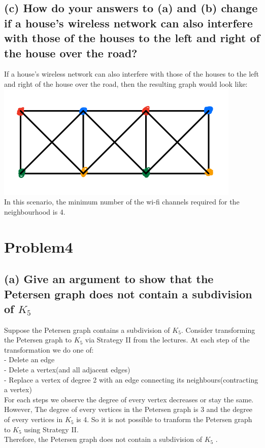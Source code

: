 \documentclass[]{article}
\begin{document}
\begin{spacing}{1.5}
		\subsection*{(c) How do your answers to (a) and (b) change if a house's wireless network can also interfere with those of the houses to the left and right of the house over the road?}
		If a house's wireless network can also interfere with those of the houses to the left and right of the house over the road, then the resulting graph would look like:\\
		\includegraphics{3}\\
		In this scenario, the minimum number of the wi-fi channels required for the neighbourhood is 4.
		
		
		\section*{Problem4}
		\subsection*{(a) Give an argument to show that the Petersen graph does not contain a subdivision of $ K_5 $}
		Suppose the Petersen graph contains a subdivision of $ K_5 $. Consider transforming the Petersen graph to $ K_5 $ via Strategy II from the lectures. At each step of the transformation we do one of:\\
		- Delete an edge\\
		- Delete a vertex(and all adjacent edges)\\
		- Replace a vertex of degree 2 with an edge connecting its neighbours(contracting a vertex)\\
		For each steps we observe the degree of every vertex decreases or stay the same. However, The degree of every vertices in the Petersen graph is 3 and the degree of every vertices in $ K_5 $  is 4. So it is not possible to tranform the Petersen graph to $ K_5 $ using Strategy II.\\
		Therefore, the Petersen graph does not contain a subdivision of $ K_5 $ .
		

\end{spacing}
\end{document}
